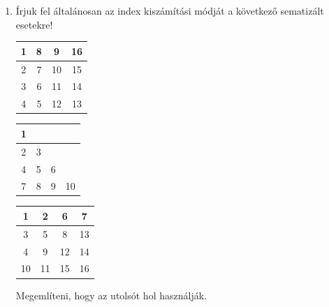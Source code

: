 \documentclass[a4paper]{article}
\newenvironment{solution}
{\color{RoyalBlue}}{\bigskip}
\begin{document}
\begin{enumerate}
\begin{solution}
@: Címe operátor/címképző operátor (\textit{at}, hasonló a C nyelv \texttt{\&} operátorához)

\begin{itemize}
\item vektor: $@(v_k) = a + (k - 1) \cdot h$
\item sorfolytonos tárolás: $@(a_{ij}) = a + [(i - 1) \cdot n + j - 1] \cdot h$
\item oszlopfolytonos tárolás: $@(a_{ij}) = a + [(j - 1) \cdot m + i - 1] \cdot h$
\end{itemize}

\end{solution}

\begin{itemize}
	\item Hogyan tudjuk az indexből visszaszámolni a sort és az oszlopot?
	\item Hogyan számíthatjuk át az indexet sor- és oszlopfolytonos tárolási mód között?
\end{itemize}	
	
\item

Írjuk fel általánosan az index kiszámítási módját a következő sematizált esetekre!

\medskip

\begin{tabular}{|c|c|c|c|}
\hline
1 & 8 & 9 & 16 \\
\hline
2 & 7 & 10 & 15 \\
\hline
3 & 6 & 11 & 14 \\
\hline
4 & 5 & 12 & 13 \\
\hline
\end{tabular}
\quad
\begin{tabular}{|c|c|c|c|}
\hline
1 &  &  &  \\
\hline
2 & 3 &  &  \\
\hline
4 & 5 & 6 &  \\
\hline
7 & 8 & 9 & 10 \\
\hline
\end{tabular}
\quad
\begin{tabular}{|c|c|c|c|}
\hline
1 & 2 & 6 & 7 \\
\hline
3 & 5 & 8 & 13 \\
\hline
4 & 9 & 12 & 14 \\
\hline
10 & 11 & 15 & 16 \\
\hline
\end{tabular}

\begin{solution}
Megemlíteni, hogy az utolsót hol használják.
\end{solution}


\end{enumerate}
\end{document}
